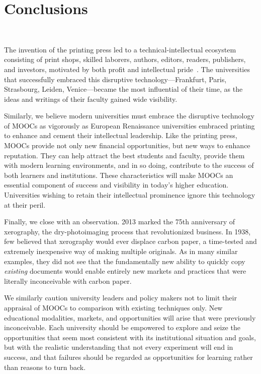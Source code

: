 \section{Conclusions}

\\



The invention of the printing press led to a technical-intellectual ecosystem consisting of print
shops, skilled laborers, authors, editors, readers, publishers, and investors, motivated by both
profit and intellectual pride~\cite{febvre}.  The universities that successfully embraced this
disruptive technology---Frankfurt, Paris, Strasbourg, Leiden, Venice---became the most influential
of their time, as the ideas and writings of their faculty gained wide visibility.

Similarly, we believe modern universities must embrace the disruptive technology of MOOCs as
vigorously as European Renaissance universities embraced printing to enhance and cement their
intellectual leadership.  Like the printing press, MOOCs provide not only new financial
opportunities,
but new ways to enhance reputation.  They can help attract the best students and faculty, provide
them with modern learning environments, and in so doing, contribute to the success of both learners
and institutions.  These characteristics will make MOOCs an essential component of success and
visibility in today's higher education.  Universities wishing to retain their intellectual
prominence ignore this technology at their peril.

Finally, we close with an observation.  2013 marked the 75th anniversary of xerography, the
dry-photoimaging process that revolutionized business. In 1938, few believed that xerography would
ever displace carbon paper, a time-tested and extremely inexpensive way of making multiple
originals.  As in many similar examples, they did not see that the fundamentally new ability to
quickly copy \emph{existing} documents would enable entirely new markets and practices that were
literally inconceivable with carbon paper.

We similarly caution university leaders and policy makers not to limit their appraisal of MOOCs to
comparison with existing techniques only.  New educational modalities, markets, and opportunities
will arise that were previously inconceivable.  Each university should be empowered to explore and
seize the opportunities that seem most consistent with its institutional situation and goals, but
with the realistic understanding that not every experiment will end in success, and that failures
should be regarded as opportunities for learning rather than reasons to turn back.



